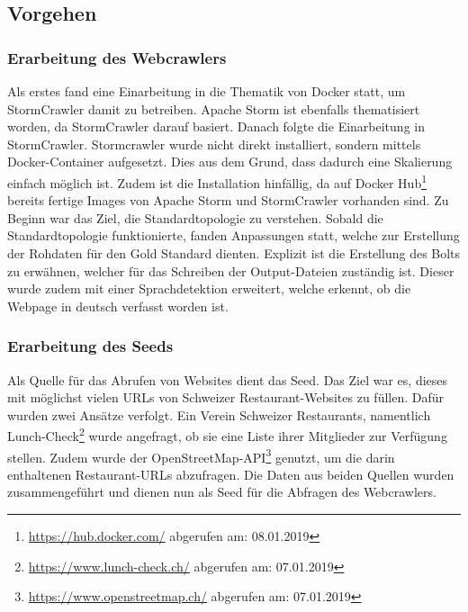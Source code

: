 \subsection{Vorgehen}
\subsubsection{Erarbeitung des Webcrawlers}
Als erstes fand eine Einarbeitung in die Thematik von Docker statt, um StormCrawler damit zu betreiben.
Apache Storm ist ebenfalls thematisiert worden, da StormCrawler darauf basiert.
Danach folgte die Einarbeitung in StormCrawler.
Stormcrawler wurde nicht direkt installiert, sondern mittels Docker-Container aufgesetzt.
Dies aus dem Grund, dass dadurch eine Skalierung einfach möglich ist.
Zudem ist die Installation hinfällig, da auf Docker Hub\footnote{\url{https://hub.docker.com/} abgerufen am: 08.01.2019} bereits fertige Images von Apache Storm und StormCrawler vorhanden sind.
Zu Beginn war das Ziel, die Standardtopologie zu verstehen.
Sobald die Standardtopologie funktionierte, fanden Anpassungen statt, welche zur Erstellung der Rohdaten für den Gold Standard dienten.
Explizit ist die Erstellung des Bolts zu erwähnen, welcher für das Schreiben der Output-Dateien zuständig ist.
Dieser wurde zudem mit einer Sprachdetektion erweitert, welche erkennt, ob die Webpage in deutsch verfasst worden ist.\\
\subsubsection{Erarbeitung des Seeds}
Als Quelle für das Abrufen von Websites dient das Seed.
Das Ziel war es, dieses mit möglichst vielen URLs von Schweizer Restaurant-Websites zu füllen.
Dafür wurden zwei Ansätze verfolgt.
Ein Verein Schweizer Restaurants, namentlich Lunch-Check\footnote{\url{https://www.lunch-check.ch/} abgerufen am: 07.01.2019} wurde angefragt, ob sie eine Liste ihrer Mitglieder zur Verfügung stellen.
Zudem wurde der OpenStreetMap-API\footnote{\url{https://www.openstreetmap.ch/} abgerufen am: 07.01.2019} genutzt, um die darin enthaltenen Restaurant-URLs abzufragen.
Die Daten aus beiden Quellen wurden zusammengeführt und dienen nun als Seed für die Abfragen des Webcrawlers.
